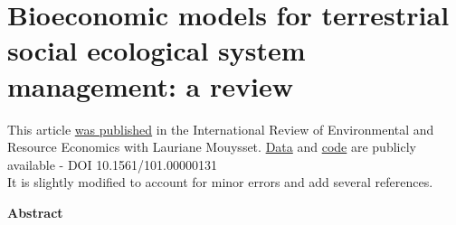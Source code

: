 \chapter{Bioeconomic models for terrestrial social ecological system management: a review}
\label{chapter1}
\onehalfspacing

\begin{center}
\begin{minipage}{0.9\textwidth}
\singlespacing
This article \href{https://sim-jean.github.io/files/research/jean_mouysset2022.pdf}{was published} in the International Review of Environmental and Resource Economics with Lauriane Mouysset. \href{https://zenodo.org/records/6656433}{Data} and \href{https://github.com/sim-jean/review-irere/tree/main}{code} are publicly available - DOI 10.1561/101.00000131\\
It is slightly modified to account for minor errors and add several references.
\end{minipage}

\vspace*{1cm}

\textbf{Abstract}\par
    \vspace*{.2cm}
    \noindent


\end{center}
